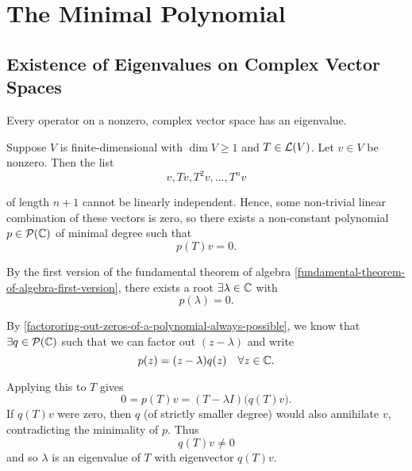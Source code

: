\section{The Minimal Polynomial}
\subsection{Existence of Eigenvalues on Complex Vector Spaces}

\begin{thm} 
  \label{thm: existence of eigenvalues}
  Every operator on a \fd non\-zero, complex vector space has an eigenvalue.
\end{thm}
\begin{prf}
  Suppose $V$ is finite-dimensional with $\dim V \geq 1$ and $T\in \mathcal{L}(V)$. Let $v\in V$ be nonzero. Then the list
  \begin{equation}
    v, Tv, T^2v, \dots, T^nv
  \end{equation}

  of length $n+1$ cannot be linearly independent. Hence, some non-trivial linear combination of these vectors is zero, so there exists a non-constant polynomial $p \in \mathcal{P}(\mathbb{C})$ of minimal degree such that
  \begin{equation}
    p(T)v = 0.
  \end{equation}

  By the first version of the fundamental theorem of algebra \ref{fundamental-theorem-of-algebra-first-version}, there exists a root $\exists \lambda \in \mathbb{C}$ with
  \begin{equation}
    p(\lambda) = 0.
  \end{equation}

  By \ref{factororing-out-zeros-of-a-polynomial-always-possible}, we know that $\exists q \in \mathcal {P} (\mathbb{C})$ such that we can factor out $(z-\lambda)$ and write
  \begin{equation}
    p(z) = (z-\lambda)  q(z) \quad \forall z \in \mathbb{C}.
  \end{equation}

Applying this to \(T\) gives
\[
0 = p(T)v = (T-\lambda I)\bigl(q(T)v\bigr).
\]
If \(q(T)v\) were zero, then \(q\) (of strictly smaller degree) would also annihilate \(v\), contradicting the minimality of \(p\).  Thus
\[
q(T)v \neq 0
\]
and so \(\lambda\) is an eigenvalue of \(T\) with eigenvector \(q(T)v\).
%
%
\end{prf}


